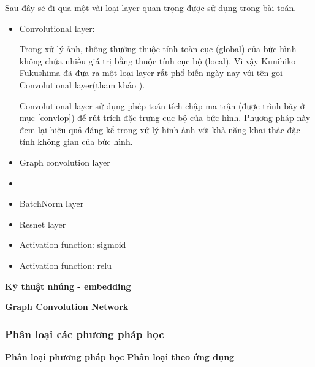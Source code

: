 Sau đây sẽ đi qua một vài loại layer quan trọng được sử dụng trong bài toán.
\begin{itemize}
    \item Convolutional layer:

    Trong xử lý ảnh, thông thường thuộc tính toàn cục (global) của bức hình không chứa nhiều giá trị bằng thuộc tính cục bộ (local). Vì vậy Kunihiko Fukushima đã đưa ra một loại layer rất phổ biến ngày nay với tên gọi Convolutional  layer(tham khảo \cite{fukushima1988neocognitron}).
    
    Convolutional layer sử dụng phép toán tích chập ma trận (được trình bày ở mục \ref{convlop}) để rút trích đặc trưng cục bộ của bức hình. Phương pháp này đem lại hiệu quả đáng kể trong xử lý hình ảnh với khả năng khai thác đặc tính không gian của bức hình.

    \item Graph convolution layer
    \item 
    \item BatchNorm layer
    \item Resnet layer
    \item Activation function: sigmoid
    \item Activation function: relu
\end{itemize}

\textbf{Kỹ thuật nhúng -  embedding}

\textbf{Graph Convolution Network}


\subsubsection{Phân loại các phương pháp học}
\textbf{Phân loại phương pháp học}
\textbf{Phân loại theo ứng dụng}

